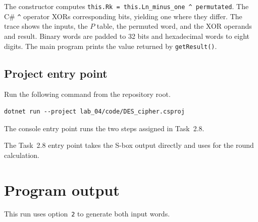 \documentclass{tum_report}
\begin{document}
The constructor computes \texttt{this.Rk = this.Ln\_minus\_one \string^ permutated}.
The C\# \texttt{\string^} operator XORs corresponding bits, yielding one where
they differ. The trace shows the inputs, the $P$ table, the permuted word,
and the XOR operands and result. Binary words are padded to 32 bits and
hexadecimal words to eight digits. The main program prints the value
returned by \texttt{getResult()}.

\section{Project entry point}
Run the following command from the repository root.
{
\begin{lstlisting}[style=console]
dotnet run --project lab_04/code/DES_cipher.csproj
\end{lstlisting}
}
The console entry point runs the two steps assigned in Task~2.8.

The Task~2.8 entry point takes the S-box output
directly and uses  for the round calculation.

\clearpage
\chapter{Program output}
This run uses option~\texttt{2} to generate both input words.

{

}

\clearpage

\par
\vspace{0.6cm}
{}

\end{document}
